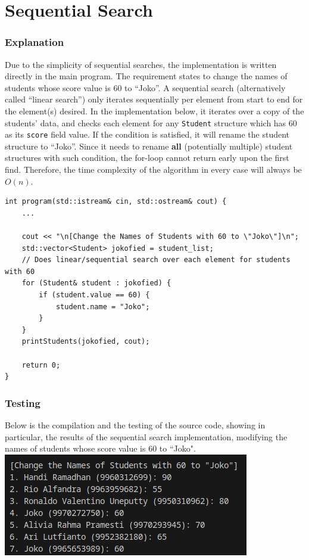 \documentclass[12pt]{article}
\begin{document}
\section{Sequential Search}

\subsubsection{Explanation}

Due to the simplicity of sequential searches, the implementation is written directly in the main program. The requirement states to change the names of students whose score value is 60 to ``Joko''. A sequential search (alternatively called ``linear search'') only iterates sequentially per element from start to end for the element(s) desired. In the implementation below, it iterates over a copy of the students' data, and checks each element for any \texttt{Student} structure which has 60 as its \texttt{score} field value. If the condition is satisfied, it will rename the student structure to ``Joko''. Since it needs to rename \textbf{all} (potentially multiple) student structures with such condition, the for-loop cannot return early upon the first find. Therefore, the time complexity of the algorithm in every case will always be $O(n)$.

\begin{verbatim}
int program(std::istream& cin, std::ostream& cout) {
    ...

    cout << "\n[Change the Names of Students with 60 to \"Joko\"]\n";
    std::vector<Student> jokofied = student_list;
    // Does linear/sequential search over each element for students with 60
    for (Student& student : jokofied) {
        if (student.value == 60) {
            student.name = "Joko";
        }
    }
    printStudents(jokofied, cout);

    return 0;
}
\end{verbatim}

\subsubsection{Testing}
Below is the compilation and the testing of the source code, showing in particular, the results of the sequential search implementation, modifying the names of students whose score value is 60 to ``Joko".
\newline\includegraphics[width=\textwidth]{01_sort_search_sequential}
\end{document}
